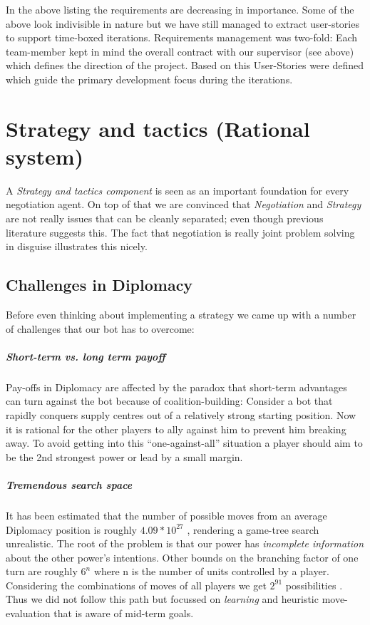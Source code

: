 \documentclass[pdftex,11pt,a4paper]{report}
\begin{document}
In the above listing the requirements are decreasing in
importance. Some of the above look indivisible in nature but we have
still managed to extract user-stories to support time-boxed
iterations. Requirements management was two-fold: Each
team-member kept in mind the overall contract with our supervisor (see
above) which defines the direction of the project.  Based on this
User-Stories were defined which guide the primary development focus
during the iterations.


\pagebreak

\chapter{Strategy and tactics (Rational system)}

A \textit{Strategy and tactics component} is seen as an important
foundation for every negotiation agent. On top of that we are 
convinced that \textit{Negotiation} and \textit{Strategy} are not
really issues that can be cleanly separated; even though previous
literature suggests this. The fact that negotiation is really
joint problem solving in disguise illustrates this nicely.

\section{Challenges in Diplomacy}

Before even thinking about implementing a strategy we came up with
a number of challenges that our bot has to overcome:

\paragraph{Short-term vs. long term payoff}
Pay-offs in Diplomacy are affected by the paradox that short-term
advantages can turn against the bot because of coalition-building:
Consider a bot that rapidly conquers supply centres out of a 
relatively strong starting position. Now it is rational for the
other players to ally against him to prevent him breaking away.
To avoid getting into this ``one-against-all'' situation a player
should aim to be the 2nd strongest power or lead by a small margin.

\paragraph{Tremendous search space}
It has been estimated that the number of possible moves from
an average Diplomacy position is roughly $4.09 * 10^{27}$ 
\cite{Kemmerling00}, rendering a game-tree search unrealistic. The root
of the problem is that our power has \textit{incomplete information} 
about the other power's intentions. Other bounds on the branching factor
of one turn are roughly $6^{n}$ where n is the number of units controlled by a
player. Considering the combinations of moves of all players we get
$2^{91}$ possibilities \cite{Shapiro02}. Thus we did not follow this
path but focussed on \textit{learning} and heuristic move-evaluation
that is aware of mid-term goals.
\end{document}
